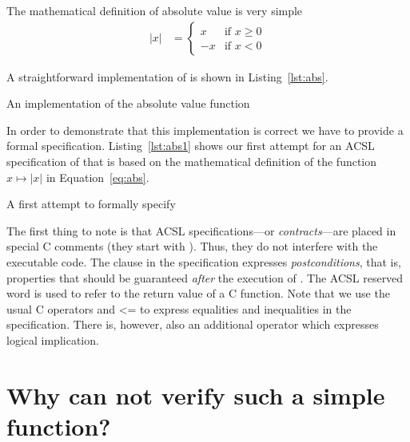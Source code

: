 The mathematical definition of absolute value is very simple
\begin{align}
\label{eq:abs}
   |x| &= \left\{
            \begin{array}{rl}
               x  & \text{if $x \geq 0$} \\
               -x & \text{if $x < 0$}
            \end{array}
          \right.
\end{align}

A straightforward implementation of  is shown in Listing~\ref{lst:abs}.

\begin{listing}[hbt]
\begin{minipage}{\textwidth}

\end{minipage}
\caption{\label{lst:abs} An implementation of the absolute value function}
\end{listing}

In order to demonstrate that this implementation is correct we have to provide
a formal specification.
Listing~\ref{lst:abs1} shows our first attempt for an ACSL specification of  that
is based on the mathematical definition of the function $x \mapsto |x|$ in Equation~\ref{eq:abs}.

\begin{listing}[hbt]
\begin{minipage}{\textwidth}

\end{minipage}
\caption{\label{lst:abs1} A first attempt to formally specify }
\end{listing}

\FloatBarrier

The first thing to note is that ACSL specifications---or \emph{contracts}---are placed in special C comments
(they start with ).
Thus, they do not interfere with the executable code.
The  clause in the specification expresses \emph{postconditions},
that is, properties that should be guaranteed \emph{after} the execution
of .
The ACSL reserved word \inl{\\result} is used to refer to the return value of a C function.
Note that we use the usual C operators \inl{==} and {<=} to express equalities and inequalities
in the specification.
There is, however, also an additional operator \inl{==>} which expresses logical implication.

\section{Why can \framacwp not verify such a simple function?}
\label{sec:framac-failure}

